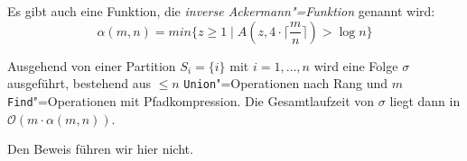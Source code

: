 Es gibt auch eine Funktion, die \textit{inverse Ackermann"=Funktion} genannt wird:
\[ \alpha(m, n) = min \{z \ge 1 \mid A(z, 4 \cdot \lceil\frac{m}{n}\rceil) > \log n\} \]

\begin{Satz}
  \hspace{\parindent}Ausgehend von einer Partition $S_i = \{ i \}$ mit $i = 1, \ldots , n$ wird eine Folge $\sigma$ ausgeführt, bestehend aus $\le n$ \texttt{Union}"=Operationen nach Rang und $m$ \texttt{Find}"=Operationen mit Pfadkompression. Die Gesamtlaufzeit von $\sigma$ liegt dann in $\mathcal{O}(m \cdot \alpha(m,n))$.
\end{Satz}

Den Beweis führen wir hier nicht.
